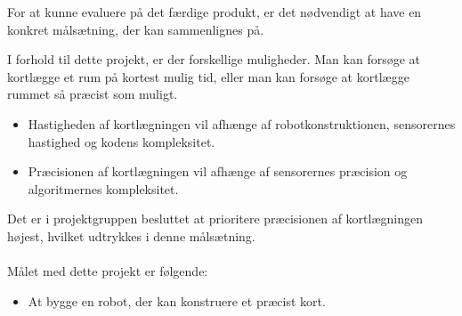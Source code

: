 For at kunne evaluere på det færdige produkt, er det nødvendigt at have en konkret målsætning, der kan sammenlignes på. 

I forhold til dette projekt, er der forskellige muligheder.
Man kan forsøge at kortlægge et rum på kortest mulig tid, eller man kan forsøge at kortlægge rummet så præcist som muligt.

\begin{itemize}
\item Hastigheden af kortlægningen vil afhænge af robotkonstruktionen, sensorernes hastighed og kodens kompleksitet.
\item Præcisionen af kortlægningen vil afhænge af sensorernes præcision og algoritmernes kompleksitet.
\end{itemize}
Det er i projektgruppen besluttet at prioritere præcisionen af kortlægningen højest, hvilket udtrykkes i denne målsætning.

\paragraph{}
\noindent Målet med dette projekt er følgende:
\begin{itemize}
\item At bygge en robot, der kan konstruere et præcist kort.
\end{itemize}
